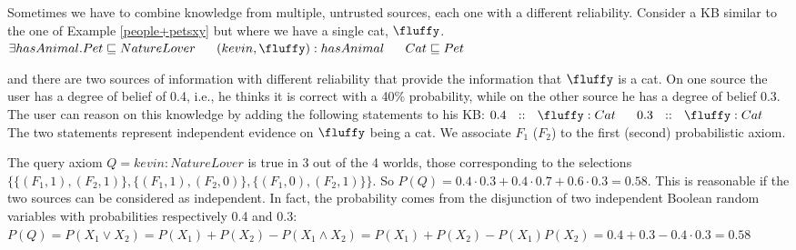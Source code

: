 \begin{example}
\label{people+pets_comb}
\begin{small}
Sometimes we have to combine knowledge from multiple, untrusted sources, each one with a different reliability. 
Consider a KB similar to the one of Example \ref{people+petsxy} but where we have a single cat, $\fluffy$.
{\center $\exists hasAnimal.Pet \sqsubseteq NatureLover\ \ \ \ \ (kevin,\fluffy):hasAnimal\ \ \ \ \ Cat\sqsubseteq Pet$\\}

\noindent and there are two sources of information with different reliability that provide the information that $\fluffy$ is a cat. 
On one source the user has a degree of belief of 0.4, i.e., he thinks it is correct with a 40\% probability,  
while on the other source he has a degree of belief 0.3. %
The user can reason on this knowledge by adding the following statements to his KB:
{\center$0.4\ \ ::\ \ \fluffy: Cat\ \ \ \ \ 0.3\ \ ::\ \ \fluffy: Cat$\\}
The two statements represent independent evidence on $\fluffy$ being a cat. We associate $F_1$ ($F_2$) to the first (second) probabilistic axiom.

The query axiom $Q=kevin:NatureLover$ is true in 3 out of the 4 worlds, those corresponding to the selections 
$
\{ \{(F_1,1),(F_2,1)\},
\{(F_1,1),(F_2,0)\},
\{(F_1,0),(F_2,1)\}\}
$. 
So 
$P(Q)=0.4\cdot 0.3+0.4\cdot 0.7+ 0.6\cdot 0.3=0.58.$
This is reasonable if the two sources can be considered as independent. In fact,  the probability comes from the  disjunction of two
independent Boolean random variables with probabilities respectively 0.4 and 0.3: 
$
P(Q) = P(X_1\vee X_2) = P(X_1)+P(X_2)-P(X_1\wedge X_2)
 = P(X_1)+P(X_2)-P(X_1)P(X_2)
 = 0.4+0.3-0.4\cdot 0.3=0.58
$
\end{small}
\end{example}
